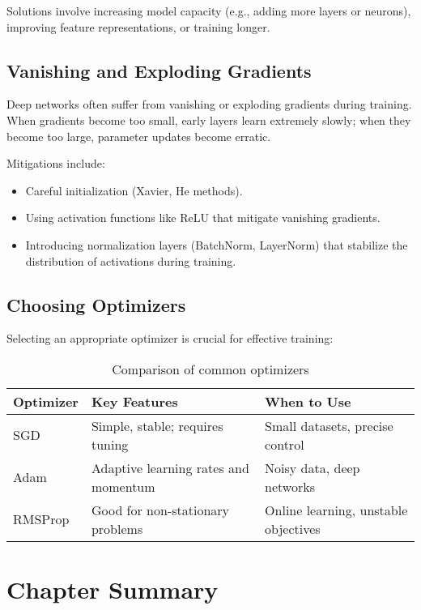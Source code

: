 \documentclass[openany]{book}
\begin{document}
Solutions involve increasing model capacity (e.g., adding more layers or 
neurons), improving feature representations, or training longer.

\subsection{Vanishing and Exploding Gradients}

Deep networks often suffer from vanishing or exploding gradients during 
training. When gradients become too small, early layers learn extremely slowly; 
when they become too large, parameter updates become erratic.

Mitigations include:
\begin{itemize}
    \item Careful initialization (Xavier, He methods).
    \item Using activation functions like ReLU that mitigate vanishing 
    gradients.
    \item Introducing normalization layers (BatchNorm, LayerNorm) that stabilize 
    the distribution of activations during training.
\end{itemize}

\subsection{Choosing Optimizers}

Selecting an appropriate optimizer is crucial for effective training:

\begin{table}[h]
\centering
\begin{tabular}{|l|l|l|}
\hline
\textbf{Optimizer} & \textbf{Key Features} & \textbf{When to Use} \\ \hline
SGD & Simple, stable; requires tuning & Small datasets, precise control \\ \hline
Adam & Adaptive learning rates and momentum & Noisy data, deep networks \\ \hline
RMSProp & Good for non-stationary problems & Online learning, unstable 
objectives \\ \hline
\end{tabular}
\caption{Comparison of common optimizers}
\end{table}

\section{Chapter Summary}
\end{document}

